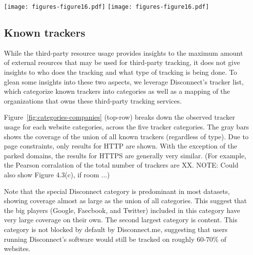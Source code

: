 \documentclass{sig-alternate-10pt}
\begin{document}
\begin{figure*}[t]
\texttt{[image: figures-figure16.pdf]}
\texttt{[image: figures-figure16.pdf]}
\caption{Domain covererage of different categories of known tracker services (top row)
and companies (bottom row), as per Disconnect's blocking list.}
\label{fig:categories-companies}
\vspace{-0pt}
\end{figure*}


\subsection{Known trackers}

While the third-party resource usage provides insights to the maximum
amount of external reources that may be used for third-party tracking,
it does not give insights to who does the tracking and what type of 
tracking is being done.
To glean some insights into these two aspects,
we leverage Disconnect's tracker list,
which categorize known trackers into categories as well as 
a mapping of the organizations that owns these third-party tracking services.

Figure~\ref{fig:categories-companies} (top-row) breaks down the observed 
tracker usage for each website categories,
across the five tracker categories.
The gray bars shows the coverage of the union of all known trackers (regardless of type).  
Due to page constraints, 
only results for HTTP are shown.
With the exception of the parked domains,
the results for HTTPS are generally very similar.
(For example, the Pearson corralation of the total number of
trackers are XX.  NOTE: Could also show Figure 4.3(c), if room ...)

Note that the  special Disconnect category is predominant in most datasets, 
showing coverage almost as large as the union of all categories. 
This suggest that the big players (Google, Faecbook, and Twitter) included
in this category have very large coverage on their own.
The second largest category is content.
This category is not blocked by default by Disconnect.me,
suggesting that users running Disconnect's software would still be tracked
on roughly 60-70\% of websites.
\end{document}
